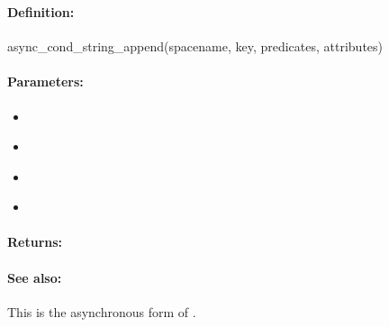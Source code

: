 \pagebreak
\subsubsection{}
\label{api:ruby:async_cond_string_append}


\paragraph{Definition:}
\begin{rubycode}
async_cond_string_append(spacename, key, predicates, attributes)
\end{rubycode}

\paragraph{Parameters:}
\begin{itemize}[noitemsep]
\item {}\\

\item {}\\

\item {}\\

\item {}\\

\end{itemize}

\paragraph{Returns:}


\paragraph{See also:}  This is the asynchronous form of .

\pagebreak
\subsubsection{}
\label{api:ruby:group_string_append}


